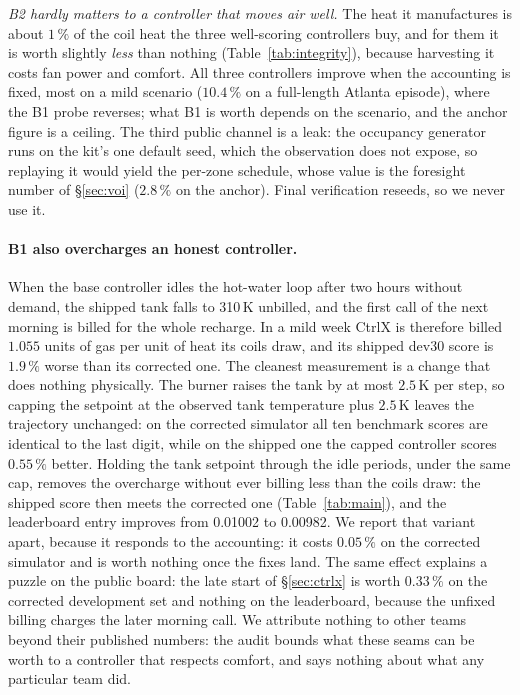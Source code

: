 \emph{B2 hardly matters to a controller that moves air well.} The heat it manufactures is about
$1\,\%$ of the coil heat the three well-scoring controllers buy, and for them it is worth slightly
\emph{less} than nothing (Table~\ref{tab:integrity}), because harvesting it costs fan power and
comfort. All three controllers improve when the accounting is fixed, most on a mild scenario
($10.4\,\%$ on a full-length Atlanta episode), where the B1 probe reverses; what B1 is worth
depends on the scenario, and the anchor figure is a ceiling.
The third public channel is a leak: the occupancy generator runs on the kit's
one default seed, which the observation does not expose, so replaying it would yield the per-zone
schedule, whose value is the foresight number of \S\ref{sec:voi} ($2.8\,\%$ on the anchor). Final verification reseeds, so we never use it.

\paragraph{B1 also overcharges an honest controller.} When the base controller idles the
hot-water loop after two hours without demand, the shipped tank falls to 310\,K unbilled, and the
first call of the next morning is billed for the whole recharge. In a mild week CtrlX is
therefore billed $1.055$ units of gas per unit of heat its coils draw, and its shipped dev30 score
is $1.9\,\%$ worse than its corrected one. The cleanest measurement is a change that does nothing
physically. The burner raises the tank by at most $2.5$\,K per step, so capping the setpoint at
the observed tank temperature plus $2.5$\,K leaves the trajectory unchanged: on the corrected
simulator all ten benchmark scores are identical to the last digit, while on the shipped one the
capped controller scores $0.55\,\%$ better. Holding the tank setpoint through the idle periods,
under the same cap, removes the overcharge without ever billing less than the coils draw: the
shipped score then meets the corrected one (Table~\ref{tab:main}), and the leaderboard entry
improves from 0.01002 to 0.00982. We report that variant apart, because it responds to the
accounting: it costs $0.05\,\%$ on the corrected simulator and is worth nothing once the fixes
land. The same effect explains a puzzle on the public board: the late start of
\S\ref{sec:ctrlx} is worth $0.33\,\%$ on the corrected development set and nothing on the
leaderboard, because the unfixed billing charges the later morning call. We attribute nothing to
other teams beyond their published numbers: the audit bounds what these seams can be worth to a
controller that respects comfort, and says nothing about what any particular team did.
